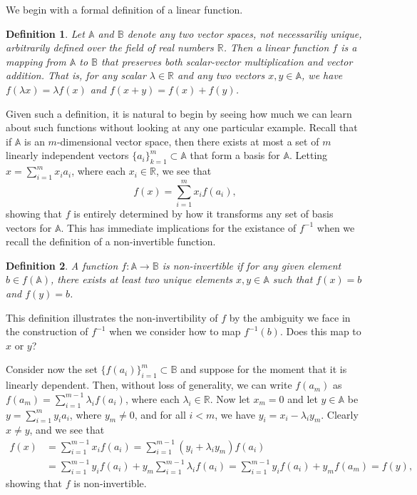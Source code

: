 \documentclass[12pt]{article}
\newcommand{\R}{\mathbb{R}}
\newcommand{\A}{\mathbb{A}}
\newcommand{\B}{\mathbb{B}}
\newtheorem{definition}{Definition}[section]
\begin{document}
We begin with a formal definition of a linear function.
\begin{definition}
Let $\A$ and $\B$ denote any two vector spaces, not necessariliy unique, arbitrarily defined
over the field of real numbers $\R$.  Then a
linear function $f$ is a mapping from $\A$ to $\B$ that preserves both scalar-vector multiplication
and vector addition.  That is, for any scalar $\lambda\in\R$ and any two vectors $x,y\in\A$,
we have $f(\lambda x)=\lambda f(x)$ and $f(x+y)=f(x)+f(y)$.
\end{definition}
Given such a definition, it is natural to begin by seeing how much we can learn about
such functions without looking at any one particular example.  Recall that if $\A$ is
an $m$-dimensional vector space, then there exists at most a set of $m$ linearly
independent vectors $\{a_i\}_{k=1}^m\subset\A$ that form a basis for $\A$.
Letting $x = \sum_{i=1}^m x_ia_i$, where each $x_i\in\R$, we see that
\begin{equation*}
f(x) = \sum_{i=1}^m x_i f(a_i),
\end{equation*}
showing that $f$ is entirely determined by how it transforms any set of basis
vectors for $\A$.  This has immediate implications for the existance of $f^{-1}$
when we recall the definition of a non-invertible function.
\begin{definition}
A function $f:\A\to\B$ is non-invertible if for any given element $b\in f(\A)$,
there exists at least two unique elements $x,y\in\A$ such that $f(x)=b$ and $f(y)=b$.
\end{definition}
This definition illustrates the non-invertibility of $f$ by the ambiguity we face in the construction
of $f^{-1}$ when we consider how to map $f^{-1}(b)$.  Does this map to $x$ or $y$?

Consider now the set $\{f(a_i)\}_{i=1}^m\subset\B$ and suppose for the moment that
it is linearly dependent.  Then, without loss of generality, we can write $f(a_m)$
as $f(a_m)=\sum_{i=1}^{m-1}\lambda_i f(a_i)$, where each $\lambda_i\in\R$.
Now let $x_m=0$ and let $y\in\A$ be $y=\sum_{i=1}^m y_i a_i$, where $y_m\neq 0$,
and for all $i<m$, we have $y_i=x_i-\lambda_i y_m$.  Clearly $x\neq y$, and we see that
\begin{align*}
f(x) &= \sum_{i=1}^{m-1} x_if(a_i)
 = \sum_{i=1}^{m-1}(y_i+\lambda_i y_m)f(a_i) \\
 &= \sum_{i=1}^{m-1}y_i f(a_i) + y_m\sum_{i=1}^{m-1}\lambda_i f(a_i)
 = \sum_{i=1}^{m-1}y_i f(a_i) + y_m f(a_m)
 = f(y),
\end{align*}
showing that $f$ is non-invertible.
\end{document}
